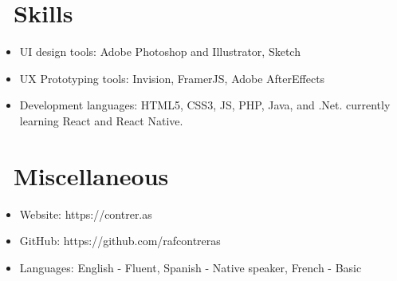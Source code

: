 \documentclass{resume}
\begin{document}
\section{\faCogs\ Skills}
\begin{itemize}[parsep=0.5ex]
  \item UI design tools: Adobe Photoshop and Illustrator, Sketch
  \item UX Prototyping tools: Invision, FramerJS, Adobe AfterEffects
  \item Development languages: HTML5, CSS3, JS, PHP, Java, and .Net. currently learning React and React Native.
\end{itemize}

\section{\faInfo\ Miscellaneous}
\begin{itemize}[parsep=0.5ex]
  \item Website: https://contrer.as
  \item GitHub: https://github.com/rafcontreras
  \item Languages: English - Fluent, Spanish - Native speaker, French - Basic
\end{itemize}

%
%
\end{document}
